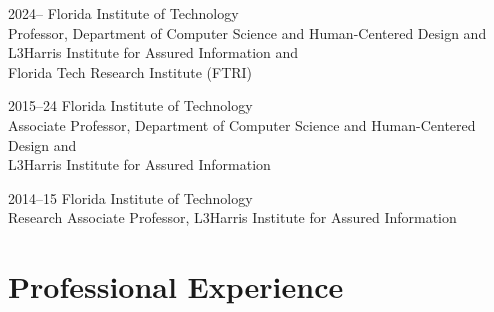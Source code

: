 \documentclass[12pt,letterpaper]{report}
\begin{document}
    \begin{tablist}

        \item[2024--]   \tab{}Florida Institute of Technology \\
                              Professor, Department of Computer Science and Human-Centered Design and\\
                              L3Harris Institute for Assured Information and \\
                              Florida Tech Research Institute (FTRI)

%
        \item[2015--24]   \tab{}Florida Institute of Technology \\
                              Associate Professor, Department of Computer Science and Human-Centered Design and\\
                              L3Harris Institute for Assured Information

        \item[2014--15]   \tab{}Florida Institute of Technology \\
                              Research Associate Professor, L3Harris Institute for Assured Information
                              
    \end{tablist}

    \section*{Professional Experience}
\end{document}
